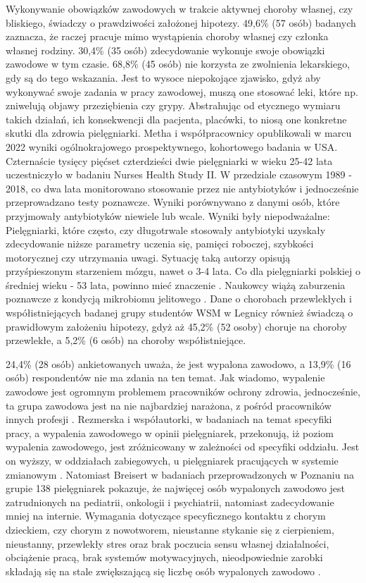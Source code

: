 \documentclass[a4paper,12pt,twoside,openany]{report}
\begin{document}
Wykonywanie obowiązków zawodowych w trakcie aktywnej choroby własnej, czy bliskiego, świadczy o prawdziwości założonej hipotezy. 49,6\% (57 osób) badanych zaznacza, że raczej pracuje mimo wystąpienia choroby własnej czy członka własnej rodziny. 30,4\% (35 osób) zdecydowanie wykonuje swoje obowiązki zawodowe w tym czasie. 68,8\% (45 osób) nie korzysta ze zwolnienia lekarskiego, gdy są do tego wskazania. Jest to wysoce niepokojące zjawisko, gdyż aby wykonywać swoje zadania w pracy zawodowej, muszą one stosować leki, które np. zniwelują objawy przeziębienia czy grypy. Abstrahując od etycznego wymiaru takich działań,  ich konsekwencji dla pacjenta, placówki, to niosą one konkretne skutki dla zdrowia pielęgniarki. Metha i współpracownicy opublikowali w marcu 2022 wyniki ogólnokrajowego prospektywnego, kohortowego badania  w USA. Czternaście tysięcy pięćset czterdzieści dwie  pielęgniarki w wieku 25-42 lata uczestniczyło w badaniu Nurses Health Study II. W przedziale czasowym 1989 - 2018,  co dwa lata monitorowano stosowanie przez nie antybiotyków i jednocześnie przeprowadzano testy poznawcze. Wyniki porównywano z danymi osób, które przyjmowały antybiotyków niewiele lub wcale. Wyniki były niepodważalne: Pielęgniarki, które często, czy długotrwale stosowały antybiotyki uzyskały zdecydowanie niższe parametry uczenia się, pamięci roboczej, szybkości motorycznej czy utrzymania uwagi. Sytuację taką autorzy opisują przyśpieszonym starzeniem mózgu, nawet o 3-4 lata.  Co dla  pielęgniarki polskiej o średniej wieku - 53 lata, powinno mieć znaczenie \cite{statystyka}.  Naukowcy  wiążą zaburzenia poznawcze z  kondycją mikrobiomu jelitowego \cite{metha}.
Dane o chorobach przewlekłych i współistniejących badanej grupy  studentów WSM w Legnicy  również  świadczą o prawidłowym założeniu hipotezy, gdyż aż 45,2\% (52 osoby) choruje na choroby przewlekłe, a 5,2\% (6 osób) na choroby współistniejące.


24,4\% (28 osób) ankietowanych uważa, że jest wypalona zawodowo, a 13,9\% (16 osób) respondentów nie ma zdania na ten temat. Jak wiadomo, wypalenie zawodowe jest ogromnym problemem pracowników ochrony zdrowia, jednocześnie, ta grupa zawodowa jest na nie najbardziej narażona,  z pośród pracowników innych profesji \cite{wypal}. Rezmerska i współautorki, w badaniach na temat specyfiki pracy, a wypalenia zawodowego w opinii pielęgniarek,  przekonują, iż poziom wypalenia zawodowego, jest zróżnicowany w zależności od specyfiki oddziału. Jest on wyższy, w oddziałach zabiegowych, u pielęgniarek pracujących w systemie zmianowym \cite{zmiany}. Natomiast Breisert w badaniach przeprowadzonych w Poznaniu na grupie 138 pielęgniarek pokazuje, że najwięcej osób wypalonych zawodowo jest zatrudnionych na pediatrii, onkologii i psychiatrii, natomiast zadecydowanie mniej na internie. Wymagania dotyczące specyficznego kontaktu z chorym dzieckiem, czy chorym z nowotworem, nieustanne stykanie się z cierpieniem, nieustanny, przewlekły stres oraz brak poczucia sensu własnej działalności, obciążenie pracą, brak systemów motywacyjnych, nieodpowiednie zarobki składają się na stale zwiększającą się liczbę osób wypalonych zawodowo \cite{breisert}.
\end{document}
